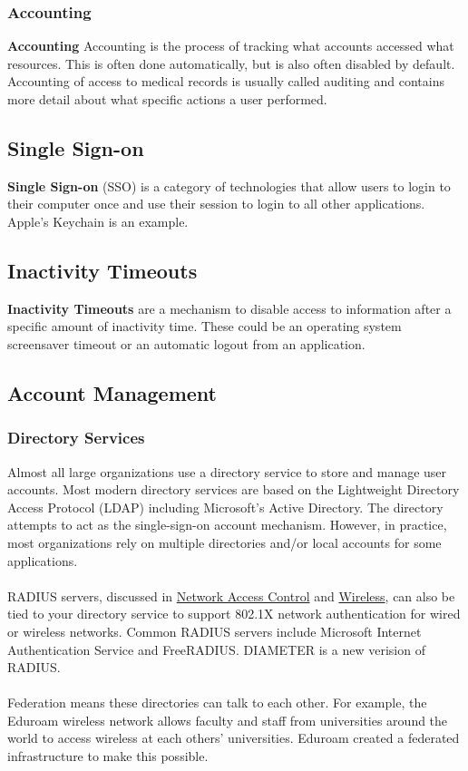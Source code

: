 \subsubsection{Accounting}\textbf{Accounting}
Accounting is the process of tracking what accounts accessed what resources. This is often done automatically, but is also often disabled by default. Accounting  of access to medical records is usually called auditing and contains more detail about what specific actions a user performed.
\subsection{Single Sign-on}\textbf{Single Sign-on} (SSO) is a category of technologies that allow users to login to their computer once and use their session to login to all other applications. Apple's Keychain is an example.
\subsection{Inactivity Timeouts}\textbf{Inactivity Timeouts} are a mechanism to disable access to information after a specific amount of inactivity time. These could be an operating system screensaver timeout or an automatic logout from an application. 
\subsection{Account Management}
\subsubsection{Directory Services}
Almost all large organizations use a directory service to store and manage user accounts. Most modern directory services are based on the Lightweight Directory Access Protocol (LDAP) including Microsoft's Active Directory. The directory attempts to act as the single-sign-on account mechanism. However, in practice, most organizations rely on multiple directories and/or local accounts for some applications.\\\\
RADIUS servers, discussed in \hyperref[subsubsec:"Network Access Control"]{Network Access Control} and \hyperref[subsec:"Wireless"]{Wireless}, can also be tied to your directory service to support 802.1X network authentication for wired or wireless networks. Common RADIUS servers include Microsoft Internet Authentication Service and FreeRADIUS. DIAMETER is a new verision of RADIUS.\\\\
Federation means these directories can talk to each other. For example, the Eduroam wireless network allows faculty and staff from universities around the world to access wireless at each others' universities. Eduroam created a federated infrastructure to make this possible.
